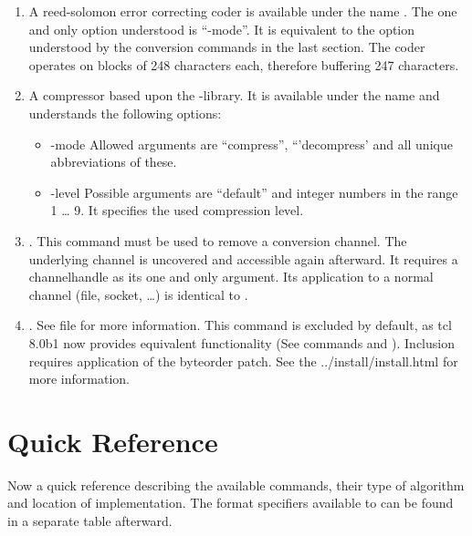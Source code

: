 \documentclass {report}
\def\installman{\htmladdnormallink {installation manual} {../install/install.html}}
\begin{document}
\begin	{enumerate}
\item	A reed-solomon error correcting coder is available under the
	name . The one and only option understood is
	``-mode''. It is equivalent to the option understood by the
	conversion commands in the last section. The coder operates on
	blocks of 248 characters each, therefore buffering 247
	characters.

\item	A compressor based upon the \zlib{}-library. It is
	available under the name  and understands the
	following options:

	\begin	{itemize}
	\item[-mode]	Allowed arguments are ``compress'',
			``'decompress' and all unique abbreviations of
			these.
	\item[-level]	Possible arguments are ``default'' and integer
			numbers in the range 1 \dots{} 9. It specifies
			the used compression level.
	\end	{itemize}

\item	{}. This command must be used to remove a
	conversion channel. The underlying channel is uncovered and
	accessible again afterward. It requires a channelhandle as its
	one and only argument. Its application to a normal channel
	(file, socket, \dots {}) is identical to .

\item	{}. See file 
	for more information. This command is excluded by default, as
	tcl 8.0b1 now provides equivalent functionality (See commands
	 and ). Inclusion requires
	application of the byteorder patch. See the \installman{} for
	more information.
\end	{enumerate}


\section {Quick Reference}
Now a quick reference describing the available commands, their type of
algorithm and location of implementation. The format specifiers
available to  can be found in a separate table afterward.
\end{document}
